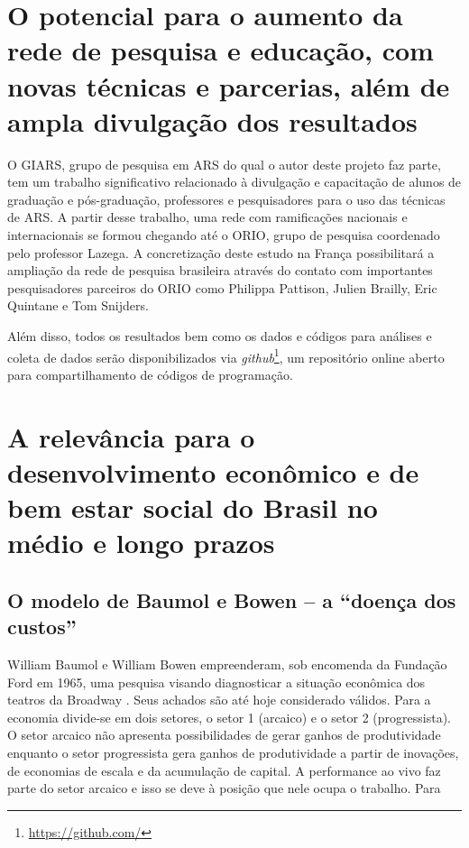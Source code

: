 \documentclass[a4paper, 12pt, openright, oneside, german, french, english, brazil, article]{abntex2}
\begin{document}
\section{O potencial para o aumento da rede de pesquisa e educação, com novas técnicas e parcerias, além de ampla divulgação dos resultados}

O GIARS, grupo de pesquisa em ARS do qual o autor deste projeto faz parte, tem um trabalho significativo relacionado à divulgação e capacitação de alunos de graduação e pós-graduação, professores e pesquisadores para o uso das técnicas de ARS. A partir desse trabalho, uma rede com ramificações nacionais e internacionais se formou chegando até o ORIO, grupo de pesquisa coordenado pelo professor Lazega. A concretização deste estudo na França possibilitará a ampliação da rede de pesquisa brasileira através do contato com importantes pesquisadores parceiros do ORIO como Philippa Pattison, Julien Brailly, Eric Quintane e Tom Snijders.

Além disso, todos os resultados bem como os dados e códigos para análises e coleta de dados serão disponibilizados via \textit{github}\footnote{\url{https://github.com/}}, um repositório online aberto para compartilhamento de códigos de programação.

\section{A relevância para o desenvolvimento econômico e de bem estar social do Brasil no médio e longo prazos}

\subsection{O modelo de Baumol e Bowen -- a ``doença dos custos''}

William Baumol e William Bowen empreenderam, sob encomenda da Fundação Ford em 1965, uma pesquisa visando diagnosticar a situação econômica dos teatros da Broadway \cite{benhamou2007economia}. Seus achados são até hoje considerado válidos. Para  a economia divide-se em dois setores, o setor 1 (arcaico) e o setor 2 (progressista). O setor arcaico não apresenta possibilidades de gerar ganhos de produtividade enquanto o setor progressista gera ganhos de produtividade a partir de inovações, de economias de escala e da acumulação de capital. A performance ao vivo faz parte do setor arcaico e isso se deve à posição que nele ocupa o trabalho. Para 
\end{document}
